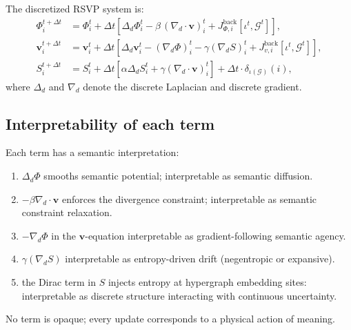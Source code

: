 The discretized RSVP system is:
\begin{align}
  \Phi_i^{t+\Delta t}
    &= \Phi_i^t
       + \Delta t \left[
           \Delta_d \Phi_i^t
           - \beta\,(\nabla_d \cdot \mathbf{v})_i^t
           + J_{\Phi,i}^{\mathrm{back}}[\iota^t,\mathcal{G}^t]
         \right], \label{eq:discPhi} \\[6pt]
  \mathbf{v}_i^{t+\Delta t}
    &= \mathbf{v}_i^t
       + \Delta t \left[
           \Delta_d \mathbf{v}_i^t
           - (\nabla_d \Phi)_i^t
           - \gamma (\nabla_d S)_i^t
           + J_{v,i}^{\mathrm{back}}[\iota^t,\mathcal{G}^t]
         \right], \label{eq:discv} \\[6pt]
  S_i^{t+\Delta t}
    &= S_i^t
       + \Delta t \left[
           \alpha \Delta_d S_i^t
           + \gamma (\nabla_d \cdot \mathbf{v})_i^t
         \right]
       + \Delta t \cdot \delta_{\iota(\mathcal{G})}(i), \label{eq:discS}
\end{align}
where $\Delta_d$ and $\nabla_d$ denote the discrete Laplacian and
discrete gradient.

\subsection{Interpretability of each term}

Each term has a semantic interpretation:

\begin{enumerate}
\item $\Delta_d \Phi$  
      smooths semantic potential; interpretable as semantic diffusion.

\item $-\beta \nabla_d \cdot \mathbf{v}$  
      enforces the divergence constraint; interpretable as semantic constraint relaxation.

\item $-\nabla_d \Phi$ in the $\mathbf{v}$-equation  
      interpretable as gradient-following semantic agency.

\item $\gamma (\nabla_d S)$  
      interpretable as entropy-driven drift (negentropic or expansive).

\item the Dirac term in $S$  
      injects entropy at hypergraph embedding sites:  
      interpretable as discrete structure interacting with continuous uncertainty.
\end{enumerate}

No term is opaque; every update corresponds to a physical action
of meaning.

